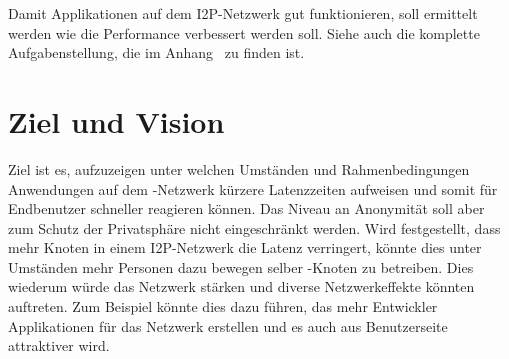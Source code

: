 Damit Applikationen auf dem I2P-Netzwerk gut funktionieren, soll ermittelt werden wie die Performance
verbessert werden soll.
Siehe auch die komplette Aufgabenstellung, die im Anhang~ zu finden ist.


\section{Ziel und Vision}\label{sec:ziel}

Ziel ist es, aufzuzeigen unter welchen Umständen und Rahmenbedingungen Anwendungen auf dem -Netzwerk kürzere Latenzzeiten aufweisen
und somit für Endbenutzer schneller reagieren können. Das Niveau an Anonymität soll aber zum Schutz der Privatsphäre nicht eingeschränkt werden.
Wird festgestellt, dass mehr Knoten in einem I2P-Netzwerk die Latenz verringert,
könnte dies unter Umständen mehr Personen dazu bewegen selber -Knoten zu betreiben.
Dies wiederum würde das Netzwerk stärken und diverse Netzwerkeffekte könnten auftreten.
Zum Beispiel könnte dies dazu führen, das mehr Entwickler Applikationen für das Netzwerk erstellen und es auch aus Benutzerseite attraktiver wird.


